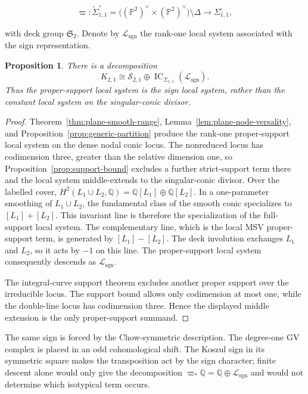 \documentclass[11pt,reqno]{amsart}
\newtheorem{proposition}[theorem]{Proposition}
\theoremstyle{definition}
\newcommand{\Q}{\mathbb Q}
\newcommand{\Pp}{\mathbb P}
\newcommand{\IC}{\operatorname{IC}}
\begin{document}
\[
  \varpi:\widetilde\Sigma_{1,1}^\circ
  =\bigl((\Pp^2)^\vee\times(\Pp^2)^\vee\bigr)\setminus\Delta
  \longrightarrow \Sigma_{1,1}^\circ,
\]

with deck group $\mathfrak S_2$.  Denote by
$\mathcal L_{\mathrm{sgn}}$ the rank-one local system associated with the
sign representation.

\begin{proposition}\label{prop:conic-sign}
There is a decomposition
\[
 K_{2,1}\cong\mathcal S_{2,1}\oplus
 \IC_{\Sigma_{1,1}}(\mathcal L_{\mathrm{sgn}}).
\]
Thus the proper-support local system is the sign local system, rather than
the constant local system on the singular-conic divisor.
\end{proposition}

\begin{proof}
Theorem~\ref{thm:plane-smooth-range},
Lemma~\ref{lem:plane-node-versality}, and
Proposition~\ref{prop:generic-partition} produce the rank-one proper-support
local system on the dense nodal conic locus.  The nonreduced locus has
codimension three, greater than the relative dimension one, so
Proposition~\ref{prop:support-bound} excludes a further strict-support term
there and the local system middle-extends to the singular-conic divisor.
Over the labelled cover,
$H^2(L_1\cup L_2,\Q)=\Q[L_1]\oplus\Q[L_2]$.
In a one-parameter smoothing of $L_1\cup L_2$, the fundamental class of the
smooth conic specializes to $[L_1]+[L_2]$.  This invariant line is therefore
the specialization of the full-support local system.  The complementary
line, which is the local MSV proper-support term, is generated by
$[L_1]-[L_2]$.  The deck involution exchanges $L_1$ and $L_2$, so it acts by
$-1$ on this line.  The proper-support local system consequently descends as
$\mathcal L_{\mathrm{sgn}}$.

The integral-curve support theorem excludes
another proper support over the irreducible locus.  The support bound allows
only codimension at most one, while the double-line locus has codimension
three.  Hence the displayed middle extension is the only proper-support
summand.
\end{proof}

The same sign is forced by the Chow-symmetric description.  The degree-one GV
complex is placed in an odd cohomological shift.  The Koszul sign in its
symmetric square makes the transposition act by the sign character; finite
descent alone would only give the decomposition
$\varpi_*\Q=\Q\oplus\mathcal L_{\mathrm{sgn}}$ and would not determine which
isotypical term occurs.
\end{document}
